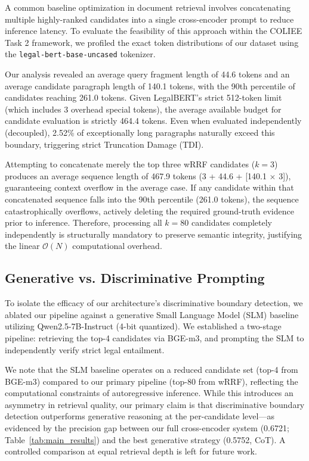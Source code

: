 \documentclass[sigconf]{acmart}
\newcommand{\rev}[1]{{\color{blue}#1}}
\begin{document}
A common baseline optimization in document retrieval involves concatenating multiple highly-ranked candidates into a single cross-encoder prompt to reduce inference latency. To evaluate the feasibility of this approach within the COLIEE Task 2 framework, we profiled the exact token distributions of our dataset using the \texttt{legal-bert-base-uncased}\cite{chalkidis2020legal} tokenizer. 

Our analysis revealed an average query fragment length of 44.6 tokens and an average candidate paragraph length of 140.1 tokens, with the 90th percentile of candidates reaching 261.0 tokens. Given LegalBERT's strict 512-token limit (which includes 3 overhead special tokens), the average available budget for candidate evaluation is strictly 464.4 tokens. Even when evaluated independently (decoupled), 2.52\% of exceptionally long paragraphs naturally exceed this boundary, triggering strict Truncation Damage (TDI). 

Attempting to concatenate merely the top three wRRF candidates ($k=3$) produces an average sequence length of 467.9 tokens (3 + 44.6 + [140.1 $\times$ 3]), guaranteeing context overflow in the average case. If any candidate within that concatenated sequence falls into the 90th percentile (261.0 tokens), the sequence catastrophically overflows, actively deleting the required ground-truth evidence prior to inference. Therefore, processing all $k=80$ candidates completely independently is structurally mandatory to preserve semantic integrity, justifying the linear $\mathcal{O}(N)$ computational overhead.

\subsection{Generative vs. Discriminative Prompting}

To isolate the efficacy of our architecture's discriminative boundary detection, we ablated our pipeline against a generative Small Language Model (SLM) baseline utilizing Qwen2.5-7B-Instruct (4-bit quantized). We established a two-stage pipeline: retrieving the top-4 candidates via BGE-m3, and prompting the SLM to independently verify strict legal entailment. 

\rev{We note that the SLM baseline operates on a reduced candidate set (top-4 from BGE-m3) compared to our primary pipeline (top-80 from wRRF), reflecting the computational constraints of autoregressive inference. While this introduces an asymmetry in retrieval quality, our primary claim is that discriminative boundary detection outperforms generative reasoning at the per-candidate level---as evidenced by the precision gap between our full cross-encoder system (0.6721; Table~\ref{tab:main_results}) and the best generative strategy (0.5752, CoT). A controlled comparison at equal retrieval depth is left for future work.}
\end{document}
